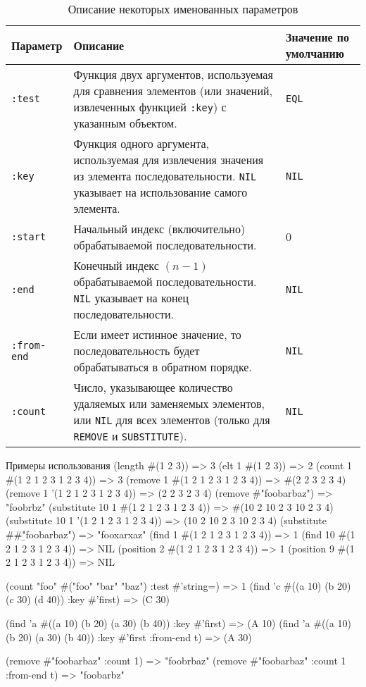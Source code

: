 \begin{table}[h!]
  \caption{Описание некоторых именованных параметров}
  \begin{center}
    \begin{tabular}{lp{8.5cm}p{2cm}}
      \toprule
      Параметр & Описание & Значение по умолчанию \\
      \midrule
      \texttt{:test} & Функция двух аргументов, используемая для сравнения элементов (или значений, извлеченных функцией \texttt{:key}) с указанным объектом. & \texttt{EQL} \\
      \texttt{:key} & Функция одного аргумента, используемая для извлечения значения из элемента последовательности. \texttt{NIL} указывает на использование самого элемента. & \texttt{NIL} \\
      \texttt{:start} & Начальный индекс (включительно) обрабатываемой последовательности. & $0$ \\
      \texttt{:end} & Конечный индекс $(n - 1)$ обрабатываемой последовательности. \texttt{NIL} указывает на конец последовательности. & \texttt{NIL} \\
      \texttt{:from-end} & Если имеет истинное значение, то последовательность будет обрабатываться в обратном порядке. & \texttt{NIL} \\
      \texttt{:count} & Число, указывающее количество удаляемых или заменяемых элементов, или \texttt{NIL} для всех элементов (только для \texttt{REMOVE} и \texttt{SUBSTITUTE}). & \texttt{NIL} \\
      \bottomrule
    \end{tabular}
  \end{center}
\end{table}

\begin{cllst}{Примеры использования}{}
(length #(1 2 3))                      => 3
(elt 1 #(1 2 3))                       => 2
(count 1 #(1 2 1 2 3 1 2 3 4))         => 3
(remove 1 #(1 2 1 2 3 1 2 3 4))        => #(2 2 3 2 3 4)
(remove 1 '(1 2 1 2 3 1 2 3 4))        => (2 2 3 2 3 4)
(remove #\a "foobarbaz")               => "foobrbz"
(substitute 10 1 #(1 2 1 2 3 1 2 3 4)) => #(10 2 10 2 3 10 2 3 4)
(substitute 10 1 '(1 2 1 2 3 1 2 3 4)) => (10 2 10 2 3 10 2 3 4)
(substitute #\x #\b "foobarbaz")       => "fooxarxaz"
(find 1 #(1 2 1 2 3 1 2 3 4))          => 1
(find 10 #(1 2 1 2 3 1 2 3 4))         => NIL
(position 2 #(1 2 1 2 3 1 2 3 4))      => 1
(position 9 #(1 2 1 2 3 1 2 3 4))      => NIL

(count "foo" #("foo" "bar" "baz") :test #'string=)    => 1
(find 'c #((a 10) (b 20) (c 30) (d 40)) :key #'first) => (C 30)

(find 'a #((a 10) (b 20) (a 30) (b 40)) :key #'first)             => (A 10)
(find 'a #((a 10) (b 20) (a 30) (b 40)) :key #'first :from-end t) => (A 30)

(remove #\a "foobarbaz" :count 1)             => "foobrbaz"
(remove #\a "foobarbaz" :count 1 :from-end t) => "foobarbz"
\end{cllst}

